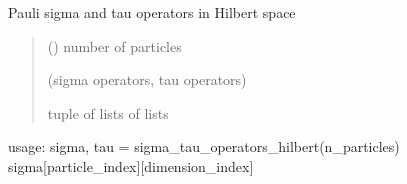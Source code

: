 \documentclass[letterpaper,10pt,english]{sphinxmanual}
\begin{document}
\begin{fulllineitems}
\label{\detokenize{spinbox:spinbox.extras.sigma_tau_operators_hilbert}}
\pysigstartsignatures
{}
\pysigstopsignatures
\sphinxAtStartPar
Pauli sigma and tau operators in Hilbert space
\begin{quote}\begin{description}
\sphinxAtStartPar
{} () \textendash{} number of particles

\sphinxAtStartPar
(sigma operators, tau operators)

\sphinxAtStartPar
tuple of lists of lists

\end{description}\end{quote}

\sphinxAtStartPar
usage: 
sigma, tau = sigma\_tau\_operators\_hilbert(n\_particles) 
sigma{[}particle\_index{]}{[}dimension\_index{]}

\end{fulllineitems}

\end{document}

